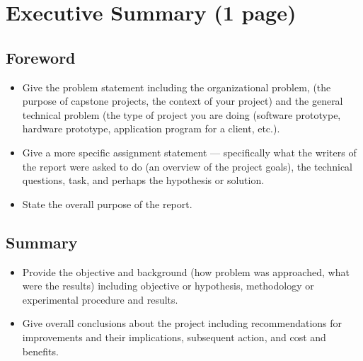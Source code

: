 \documentclass[12pt]{article}
\begin{document}
\section*{Executive Summary (1 page)}

\subsection*{Foreword}
\begin{itemize}[noitemsep]
    \item Give the problem statement including the organizational problem, (the purpose of capstone projects, the context of your project) and the general technical problem (the type of project you are doing (software prototype, hardware prototype, application program for a client, etc.).
    \item Give a more specific assignment statement --- specifically what the writers of the report were asked to do (an overview of the project goals), the technical questions, task, and perhaps the hypothesis or solution.
    \item State the overall purpose of the report.
\end{itemize}

\subsection*{Summary}
\begin{itemize}[noitemsep]
    \item Provide the objective and background (how problem was approached, what were the results) including objective or hypothesis, methodology or experimental procedure and results.
    \item Give overall conclusions about the project including recommendations for improvements and their implications, subsequent action, and cost and benefits.
\end{itemize}

\tableofcontents
\newpage

\end{document}
